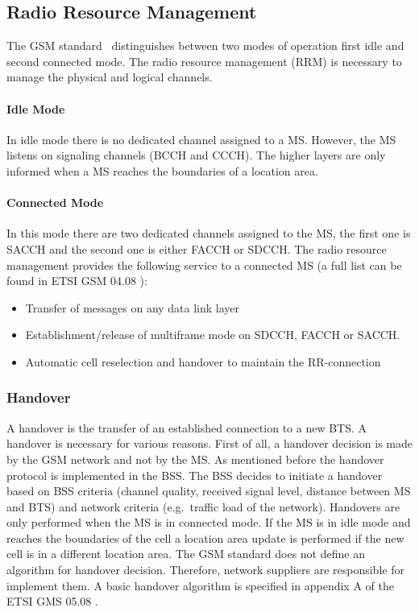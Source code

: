 \documentclass[master,english]{hgbthesis}
\begin{document}
\subsection{Radio Resource Management}
The GSM standard~\cite{Etsi1994} distinguishes between two modes of operation first idle and second connected mode. The radio resource management (RRM) is necessary to manage the physical and logical channels.
\paragraph{Idle Mode}
In idle mode there is no dedicated channel assigned to a MS. However, the MS listens on signaling channels (BCCH and CCCH). The higher layers are only informed when a MS reaches the boundaries of a location area.
\paragraph{Connected Mode}
\label{subsub:connected}
In this mode there are two dedicated channels assigned to the MS, the first one is SACCH and the second one is either FACCH or SDCCH.
The radio resource management provides the following service to a connected MS (a full list can be found in ETSI GSM 04.08 \cite{Etsi1994}):
\begin{itemize}
	\item Transfer of messages on any data link layer
	\item Establishment/release of multiframe mode on SDCCH, FACCH or SACCH.
	\item Automatic cell reselection and handover to maintain the RR-connection
\end{itemize}
\subsubsection{Handover}
A handover is the transfer of an established connection to a new BTS. A handover is necessary for various reasons. First of all, a handover decision is made by the GSM network and not by the MS. As mentioned before the handover protocol is implemented in the BSS. The BSS decides to initiate a handover based on BSS criteria (channel quality, received signal level, distance between MS and BTS) and network criteria (e.g.\ traffic load of the network).
Handovers are only performed when the MS is in connected mode. If the MS is in idle mode and reaches the boundaries of the cell a location area update is performed if the new cell is in a different location area.
The GSM standard does not define an algorithm for handover decision. Therefore, network suppliers are responsible for implement them. A basic handover algorithm is specified in appendix A of the ETSI GMS 05.08 \cite{Etsi19942}.
\end{document}
